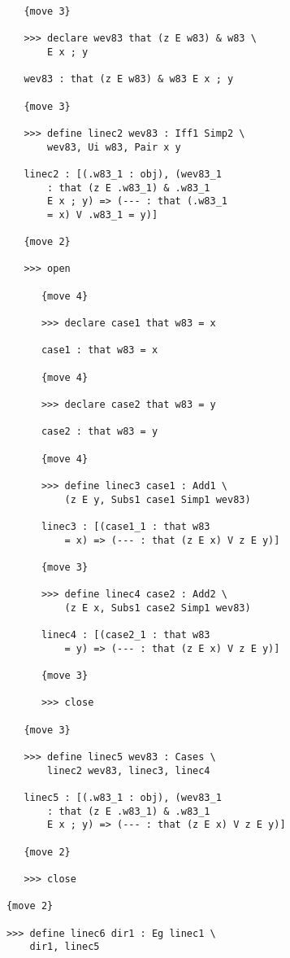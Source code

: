 \documentclass[12pt]{article}
\begin{document}
\begin{verbatim}
         {move 3}

         >>> declare wev83 that (z E w83) & w83 \
             E x ; y

         wev83 : that (z E w83) & w83 E x ; y

         {move 3}

         >>> define linec2 wev83 : Iff1 Simp2 \
             wev83, Ui w83, Pair x y

         linec2 : [(.w83_1 : obj), (wev83_1 
             : that (z E .w83_1) & .w83_1 
             E x ; y) => (--- : that (.w83_1 
             = x) V .w83_1 = y)]

         {move 2}

         >>> open

            {move 4}

            >>> declare case1 that w83 = x

            case1 : that w83 = x

            {move 4}

            >>> declare case2 that w83 = y

            case2 : that w83 = y

            {move 4}

            >>> define linec3 case1 : Add1 \
                (z E y, Subs1 case1 Simp1 wev83)

            linec3 : [(case1_1 : that w83 
                = x) => (--- : that (z E x) V z E y)]

            {move 3}

            >>> define linec4 case2 : Add2 \
                (z E x, Subs1 case2 Simp1 wev83)

            linec4 : [(case2_1 : that w83 
                = y) => (--- : that (z E x) V z E y)]

            {move 3}

            >>> close

         {move 3}

         >>> define linec5 wev83 : Cases \
             linec2 wev83, linec3, linec4

         linec5 : [(.w83_1 : obj), (wev83_1 
             : that (z E .w83_1) & .w83_1 
             E x ; y) => (--- : that (z E x) V z E y)]

         {move 2}

         >>> close

      {move 2}

      >>> define linec6 dir1 : Eg linec1 \
          dir1, linec5


\end{verbatim}
\end{document}
